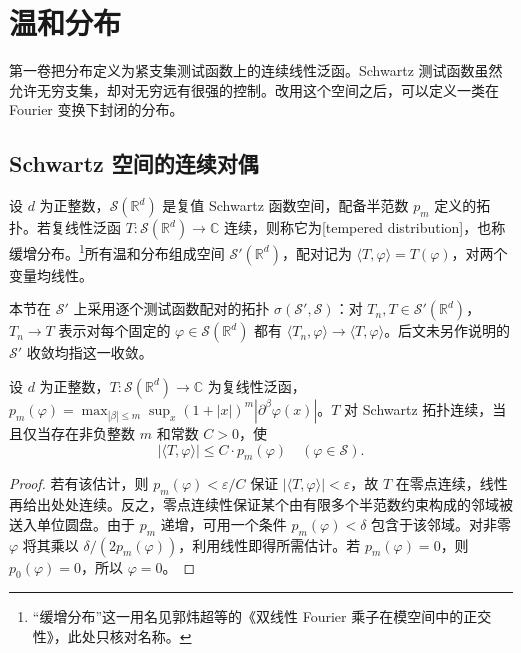\section{温和分布}
\label{b2:sec:0503}

第一卷把分布定义为紧支集测试函数上的连续线性泛函。Schwartz 测试函数虽然允许无穷支集，却对无穷远有很强的控制。改用这个空间之后，可以定义一类在 Fourier 变换下封闭的分布。

\subsection{Schwartz 空间的连续对偶}
\label{b2:subsec:050301}

\begin{definition}\label{b2:def:05-tempered}
设 \(d\) 为正整数，\(\mathcal S(\mathbb R^d)\) 是复值 Schwartz 函数空间，配备半范数 \(p_m\) 定义的拓扑。若复线性泛函 \(T:\mathcal S(\mathbb R^d)\to\mathbb C\) 连续，则称它为[tempered distribution]，也称缓增分布。\footnote{“缓增分布”这一用名见郭炜超等的《双线性 Fourier 乘子在模空间中的正交性》\cite[p. 1289]{GuoZhaoZhao2018Orthogonality}，此处只核对名称。}所有温和分布组成空间 \(\mathcal S'(\mathbb R^d)\)，配对记为 \(\langle T,\varphi\rangle=T(\varphi)\)，对两个变量均线性。

本节在 \(\mathcal S'\) 上采用逐个测试函数配对的\WeakStar{}拓扑 \(\sigma(\mathcal S',\mathcal S)\)：对 \(T_n,T\in\mathcal S'(\mathbb R^d)\)，\(T_n\to T\) 表示对每个固定的 \(\varphi\in\mathcal S(\mathbb R^d)\) 都有 \(\langle T_n,\varphi\rangle\to\langle T,\varphi\rangle\)。后文未另作说明的 \(\mathcal S'\) 收敛均指这一收敛。
\end{definition}

\begin{proposition}\label{b2:prop:05-tempered-estimate}
设 \(d\) 为正整数，\(T:\mathcal S(\mathbb R^d)\to\mathbb C\) 为复线性泛函，\(p_m(\varphi)=\max_{|\beta|\leq m}\sup_x(1+|x|)^m|\partial^\beta\varphi(x)|\)。\(T\) 对 Schwartz 拓扑连续，当且仅当存在非负整数 \(m\) 和常数 \(C>0\)，使
\[
 |\langle T,\varphi\rangle|\leq C\cdot p_m(\varphi)\quad(\varphi\in\mathcal S).
\]
\end{proposition}
\begin{proof}
若有该估计，则 \(p_m(\varphi)<\varepsilon/C\) 保证 \(|\langle T,\varphi\rangle|<\varepsilon\)，故 \(T\) 在零点连续，线性再给出处处连续。反之，零点连续性保证某个由有限多个半范数约束构成的邻域被送入单位圆盘。由于 \(p_m\) 递增，可用一个条件 \(p_m(\varphi)<\delta\) 包含于该邻域。对非零 \(\varphi\) 将其乘以 \(\delta/(2p_m(\varphi))\)，利用线性即得所需估计。若 \(p_m(\varphi)=0\)，则 \(p_0(\varphi)=0\)，所以 \(\varphi=0\)。
\end{proof}

